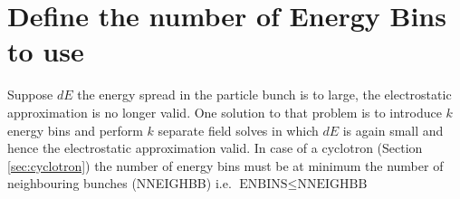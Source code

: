 \section{Define the number of Energy Bins to use}
\label{sec:FSENBINS}
Suppose $dE$ the energy spread in the particle bunch is to large, the electrostatic approximation is no longer valid. 
One solution to that problem is to introduce  $k$ energy bins  and perform $k$ separate field solves
in which $dE$ is again small and hence the electrostatic approximation valid. In case of a cyclotron 
(Section \ref{sec:cyclotron}) the number of energy bins must be at minimum the number of neighbouring bunches (NNEIGHBB) i.e.  $\text{ENBINS} \le \text{NNEIGHBB}$ 
